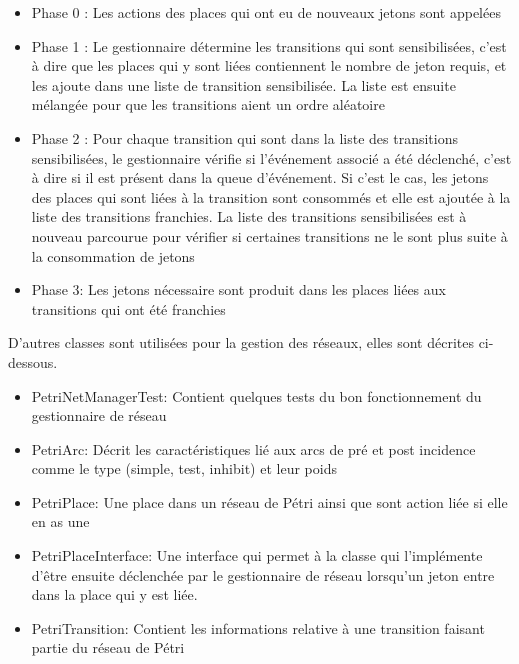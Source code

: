 \begin{itemize}
\item Phase 0 : Les actions des places qui ont eu de nouveaux jetons sont appelées
\item Phase 1 : Le gestionnaire détermine les transitions qui sont sensibilisées, c'est à dire que les places qui y sont liées contiennent le nombre de jeton requis, et les ajoute dans une liste de transition sensibilisée. La liste est ensuite mélangée pour que les transitions aient un ordre aléatoire
\item Phase 2 : Pour chaque transition qui sont dans la liste des transitions sensibilisées, le gestionnaire vérifie si l'événement associé a été déclenché, c'est à dire si il est présent dans la queue d'événement. Si c'est le cas, les jetons des places qui sont liées à la transition sont consommés et elle est ajoutée à la liste des transitions franchies. La liste des transitions sensibilisées est à nouveau parcourue pour vérifier si certaines transitions ne le sont plus suite à la consommation de jetons
\item Phase 3: Les jetons nécessaire sont produit dans les places liées aux transitions qui ont été franchies\\
\end{itemize}

D'autres classes sont utilisées pour la gestion des réseaux, elles sont décrites ci-dessous.

\begin{itemize}
\item PetriNetManagerTest: Contient quelques tests du bon fonctionnement du gestionnaire de réseau
\item PetriArc: Décrit les caractéristiques lié aux arcs de pré et post incidence comme le type (simple, test, inhibit) et leur poids
\item PetriPlace: Une place dans un réseau de Pétri ainsi que sont action liée si elle en as une
\item PetriPlaceInterface: Une interface qui permet à la classe qui l'implémente d'être ensuite déclenchée par le gestionnaire de réseau lorsqu'un jeton entre dans la place qui y est liée.
\item PetriTransition: Contient les informations relative à une transition faisant partie du réseau de Pétri
\end{itemize}
